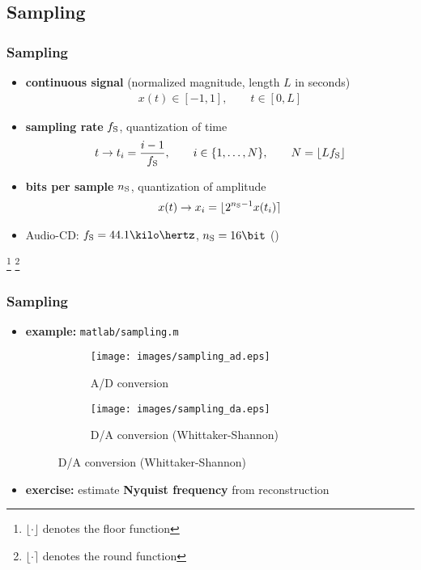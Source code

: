
\subsection{Sampling}

\begin{frame}
	\frametitle{Sampling}
	\begin{itemize}
		\item \textbf{continuous signal} (normalized magnitude, length $L$ in seconds)
			\begin{align*}
				x(t)\in[-1,1],\qquad t\in[0,L]
			\end{align*}
		\item \textbf{sampling rate} $f_{\textrm S}$, quantization of time
			\begin{align*}
				t\rightarrow t_i=\frac{i-1}{f_{\textrm S}},\qquad i\in\{1,\ldots,N\},\qquad N=\lfloor Lf_{\textrm S}\rfloor
			\end{align*}
		\item \textbf{bits per sample} $n_{\textrm S}$, quantization of amplitude
			\begin{align*}
				x(t)\rightarrow x_i=\lfloor2^{n_{\textrm S}-1}x(t_i)\rceil
			\end{align*}
		\item Audio-CD: $f_{\textrm S}=44.1\kilo\hertz$, $n_{\textrm S}=16\bit$ ()
	\end{itemize}
	{\let\thefootnote\relax\footnote{$\lfloor\cdot\rfloor$ denotes the floor function}}
	{\let\thefootnote\relax\footnote{$\lfloor\cdot\rceil$ denotes the round function}}
\end{frame}

\begin{frame}
	\frametitle{Sampling}
	\begin{itemize}
		\item \textbf{example:} \texttt{matlab/sampling.m}
			\begin{figure}
				\centering
				\begin{subfigure}[t]{0.48\linewidth}
					\texttt{[image: images/sampling\_ad.eps]}
					\caption{A/D conversion}
				\end{subfigure}
				\hspace{0.02\linewidth}
				\begin{subfigure}[t]{0.48\linewidth}
					\texttt{[image: images/sampling\_da.eps]}
					\caption{D/A conversion (Whittaker-Shannon)}
				\end{subfigure}
			\end{figure}
		\item \textbf{exercise:} estimate \textbf{Nyquist frequency} from reconstruction
	\end{itemize}
\end{frame}

